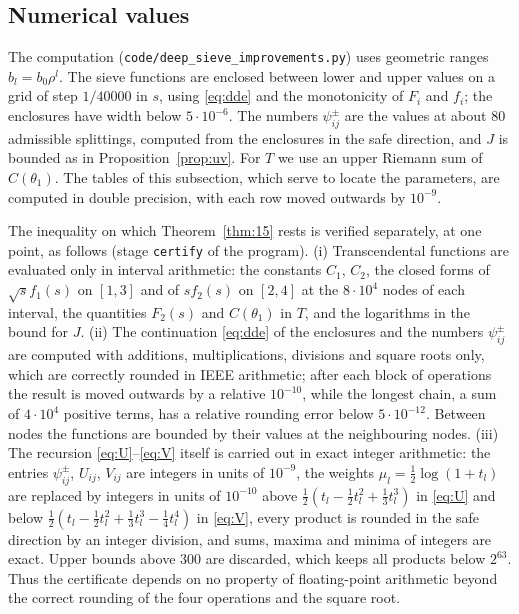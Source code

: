 \documentclass[11pt,a4paper]{amsart}
\theoremstyle{remark}
\numberwithin{equation}{section}
\begin{document}
\subsection{Numerical values}
The computation (\texttt{code/deep\_sieve\_improvements.py}) uses geometric ranges $b_l=b_0\rho^l$. The sieve
functions are enclosed between lower and upper values on a grid of step $1/40000$ in $s$, using
\eqref{eq:dde} and the monotonicity of $F_i$ and $f_i$; the enclosures have width below $5\cdot10^{-6}$. The
numbers $\psi^\pm_{ij}$ are the values at about $80$ admissible splittings, computed from the enclosures in the
safe direction, and $J$ is bounded as in Proposition~\ref{prop:uv}. For $T$ we use an upper Riemann sum of
$C(\theta_1)$. The tables of this subsection, which serve to locate the parameters, are computed in double
precision, with each row moved outwards by $10^{-9}$.

The inequality on which Theorem~\ref{thm:15} rests is verified separately, at one point, as follows
(stage \texttt{certify} of the program). (i) Transcendental functions are evaluated only in interval arithmetic:
the constants $C_1$, $C_2$, the closed forms of $\sqrt sf_1(s)$ on $[1,3]$ and of $sf_2(s)$ on $[2,4]$ at the
$8\cdot10^4$ nodes of each interval, the quantities $F_2(s)$ and $C(\theta_1)$ in $T$, and the logarithms in the
bound for $J$. (ii) The continuation \eqref{eq:dde} of the enclosures and the numbers $\psi^\pm_{ij}$ are computed
with additions, multiplications, divisions and square roots only, which are correctly rounded in IEEE
arithmetic; after each block of operations the result is moved outwards by a relative $10^{-10}$, while the
longest chain, a sum of $4\cdot10^4$ positive terms, has a relative rounding error below $5\cdot10^{-12}$. Between
nodes the functions are bounded by their values at the neighbouring nodes. (iii) The recursion
\eqref{eq:U}--\eqref{eq:V} itself is carried out in exact integer arithmetic: the entries $\psi^\pm_{ij}$,
$U_{ij}$, $V_{ij}$ are integers in units of $10^{-9}$, the weights $\mu_l=\frac12\log(1+t_l)$ are replaced by
integers in units of $10^{-10}$ above $\frac12(t_l-\frac12t_l^2+\frac13t_l^3)$ in \eqref{eq:U} and below
$\frac12(t_l-\frac12t_l^2+\frac13t_l^3-\frac14t_l^4)$ in \eqref{eq:V}, every product is rounded in the safe direction
by an integer division, and sums, maxima and minima of integers are exact. Upper bounds above $300$ are
discarded, which keeps all products below $2^{63}$. Thus the certificate depends on no property of floating-point
arithmetic beyond the correct rounding of the four operations and the square root.
\end{document}
